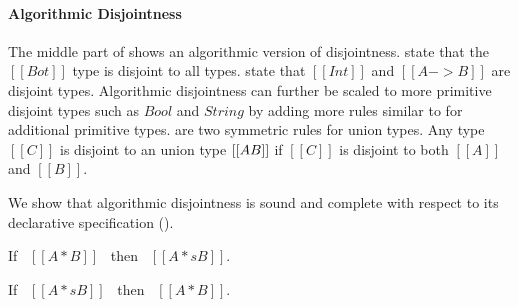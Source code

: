 \paragraph{Algorithmic Disjointness}
The middle part of  shows an algorithmic
version of disjointness.   state that the $[[Bot]]$
type is disjoint to all types.   state that
$[[Int]]$ and $[[A -> B]]$ are disjoint types.  Algorithmic
disjointness can further be scaled to more primitive disjoint types
such as $Bool$ and $String$ by adding more rules similar to
 for additional primitive types.   are two symmetric rules for union types. Any type $[[C]]$ is
disjoint to an union type $[[A \/ B]]$ if $[[C]]$ is disjoint to both
$[[A]]$ and $[[B]]$.

We show that algorithmic disjointness is sound and complete
with respect to its declarative specification ().

\begin{lemma}
  If \ $[[A * B]]$ \ then \ $[[A *s B]]$.
\label{lemma:union:disj-sound}
\end{lemma}

\begin{comment}
\begin{proof}
  By induction on algorithmic disjointness relation.
  \begin{itemize}
    \item Cases \rref{ad-btmr, ad-btml, ad-orl, ad-orr} require induction on hypothesis
          and \Cref{lemma:union:sub-or}.
    \item Cases \rref{ad-intl, ad-intr} require induction on type and \Cref{lemma:union:sub-or}.
  \end{itemize}
\end{proof}
\end{comment}

\begin{lemma}
  If \ $[[A *s B]]$ \ then \ $[[A * B]]$.
\label{lemma:union:disj-complete}
\end{lemma}

\begin{comment}
\begin{proof}
  By induction on type A.
  \begin{itemize}
    \item Case $[[Top]]$ requires \Cref{lemma:union:bl-disj}.
    \item Case $[[Bot]]$ is trivial to prove.
    \item Case $[[Int]]$ requires induction on type B and
          \Cref{lemma:union:bl-disj,lemma:union:disj-sym}.
    \item Case $[[A -> B]]$ requires induction on type B and \Cref{lemma:union:disj-sym}.
    \item Case $[[A \/ B]]$ follows directly from inductive hypothesis.
  \end{itemize}
\end{proof}
\end{comment}

